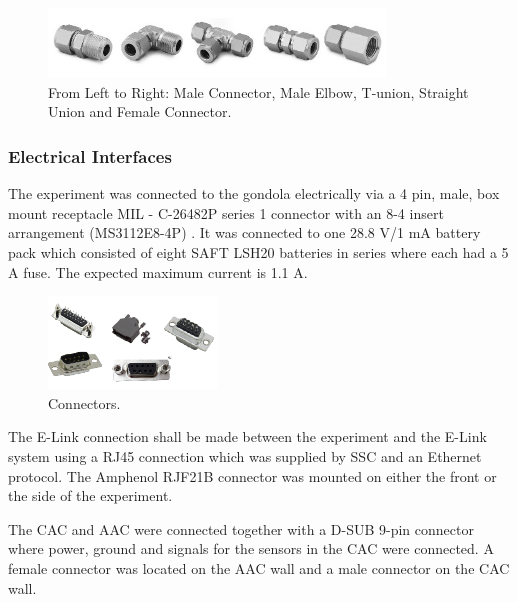 \begin{figure}[H]
    \centering
    \includegraphics[width=0.8\textwidth]{4-experiment-design/img/Mechanical/AAC-interfaces.jpg}
    \caption{From Left to Right: Male Connector, Male Elbow, T-union, Straight Union and Female Connector.}
    \label{fig:AAC-interfaces-fittings}
\end{figure}




\subsubsection{Electrical Interfaces}
\label{sec:4.2.3}

The experiment was connected to the gondola electrically via a 4 pin, male, box mount receptacle MIL - C-26482P series 1 connector with an 8-4 insert arrangement (MS3112E8-4P) \cite{BexusManual}. It was connected to one 28.8 V/1 mA battery pack which consisted of eight SAFT LSH20 batteries in series where each had a 5 A fuse\cite{BexusManual}. The expected maximum current is 1.1 A.

\begin{figure}[H]
    \centering
    \includegraphics[width=0.4\textwidth]{4-experiment-design/img/connectors.png}
    \caption{Connectors.}
    \label{fig:connectors}
\end{figure}

The E-Link connection shall be made between the experiment and the E-Link system using a RJ45 connection which was supplied by SSC and an Ethernet protocol. The Amphenol RJF21B connector was mounted on either the front or the side of the experiment\cite{BexusManual}.  

The CAC and AAC were connected together with a D-SUB 9-pin connector where power, ground and signals for the sensors in the CAC were connected. A female connector was located on the AAC wall and a male connector on the CAC wall.

